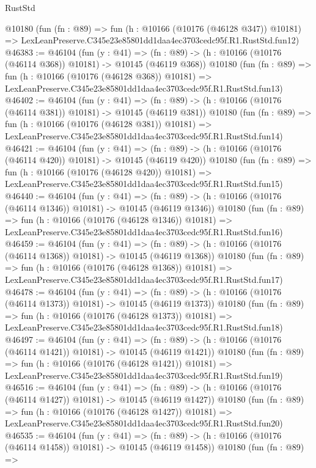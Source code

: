 \begin{lexlean}{RustStd}
\begin{coremodule}
    @10180
    (fun (fn : @89) =>
    fun (h : @10166 (@10176 (@46128 @347)) @10181) =>
    LexLeanPreserve.C345e23e85801dd1daa4ec3703cedc95f.R1.RustStd.fun12)
@46383 := @46104
    (fun (y : @41) =>
    (fn : @89) -> (h : @10166 (@10176 (@46114 @368)) @10181) -> @10145 (@46119 @368))
    @10180
    (fun (fn : @89) =>
    fun (h : @10166 (@10176 (@46128 @368)) @10181) =>
    LexLeanPreserve.C345e23e85801dd1daa4ec3703cedc95f.R1.RustStd.fun13)
@46402 := @46104
    (fun (y : @41) =>
    (fn : @89) -> (h : @10166 (@10176 (@46114 @381)) @10181) -> @10145 (@46119 @381))
    @10180
    (fun (fn : @89) =>
    fun (h : @10166 (@10176 (@46128 @381)) @10181) =>
    LexLeanPreserve.C345e23e85801dd1daa4ec3703cedc95f.R1.RustStd.fun14)
@46421 := @46104
    (fun (y : @41) =>
    (fn : @89) -> (h : @10166 (@10176 (@46114 @420)) @10181) -> @10145 (@46119 @420))
    @10180
    (fun (fn : @89) =>
    fun (h : @10166 (@10176 (@46128 @420)) @10181) =>
    LexLeanPreserve.C345e23e85801dd1daa4ec3703cedc95f.R1.RustStd.fun15)
@46440 := @46104
    (fun (y : @41) =>
    (fn : @89) -> (h : @10166 (@10176 (@46114 @1346)) @10181) -> @10145 (@46119 @1346))
    @10180
    (fun (fn : @89) =>
    fun (h : @10166 (@10176 (@46128 @1346)) @10181) =>
    LexLeanPreserve.C345e23e85801dd1daa4ec3703cedc95f.R1.RustStd.fun16)
@46459 := @46104
    (fun (y : @41) =>
    (fn : @89) -> (h : @10166 (@10176 (@46114 @1368)) @10181) -> @10145 (@46119 @1368))
    @10180
    (fun (fn : @89) =>
    fun (h : @10166 (@10176 (@46128 @1368)) @10181) =>
    LexLeanPreserve.C345e23e85801dd1daa4ec3703cedc95f.R1.RustStd.fun17)
@46478 := @46104
    (fun (y : @41) =>
    (fn : @89) -> (h : @10166 (@10176 (@46114 @1373)) @10181) -> @10145 (@46119 @1373))
    @10180
    (fun (fn : @89) =>
    fun (h : @10166 (@10176 (@46128 @1373)) @10181) =>
    LexLeanPreserve.C345e23e85801dd1daa4ec3703cedc95f.R1.RustStd.fun18)
@46497 := @46104
    (fun (y : @41) =>
    (fn : @89) -> (h : @10166 (@10176 (@46114 @1421)) @10181) -> @10145 (@46119 @1421))
    @10180
    (fun (fn : @89) =>
    fun (h : @10166 (@10176 (@46128 @1421)) @10181) =>
    LexLeanPreserve.C345e23e85801dd1daa4ec3703cedc95f.R1.RustStd.fun19)
@46516 := @46104
    (fun (y : @41) =>
    (fn : @89) -> (h : @10166 (@10176 (@46114 @1427)) @10181) -> @10145 (@46119 @1427))
    @10180
    (fun (fn : @89) =>
    fun (h : @10166 (@10176 (@46128 @1427)) @10181) =>
    LexLeanPreserve.C345e23e85801dd1daa4ec3703cedc95f.R1.RustStd.fun20)
@46535 := @46104
    (fun (y : @41) =>
    (fn : @89) -> (h : @10166 (@10176 (@46114 @1458)) @10181) -> @10145 (@46119 @1458))
    @10180
    (fun (fn : @89) =>

\end{coremodule}
\end{lexlean}
